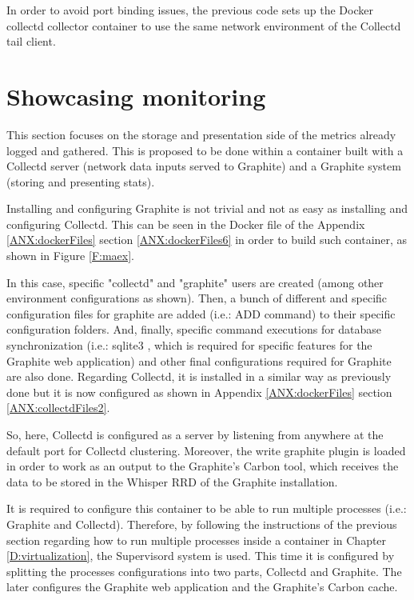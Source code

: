 In order to avoid port binding issues, the previous code sets up the Docker collectd collector container to use the same network environment of the Collectd tail client.

\section{Showcasing monitoring}

This section focuses on the storage and presentation side of the metrics already logged and gathered. This is proposed to be done within a container built with a Collectd server (network data inputs served to Graphite) and a Graphite system (storing and presenting stats).

Installing and configuring Graphite is not trivial and not as easy as installing and configuring Collectd. This can be seen in the Docker file of the Appendix \ref{ANX:dockerFiles} section \ref{ANX:dockerFiles6} in order to build such container, as shown in Figure \ref{F:maex}.

In this case, specific "collectd" and "graphite" users are created (among other environment configurations as shown). Then, a bunch of different and specific configuration files for graphite are added (i.e.: ADD command) to their specific configuration folders. And, finally, specific command executions for database synchronization (i.e.: sqlite3 \cite{sqlite}, which is required for specific features for the Graphite web application) and other final configurations required for Graphite are also done. Regarding Collectd, it is installed in a similar way as previously done but it is now configured as shown in Appendix \ref{ANX:dockerFiles} section \ref{ANX:collectdFiles2}.

So, here, Collectd is configured as a server by listening from anywhere at the default port for Collectd clustering. Moreover, the write graphite plugin is loaded in order to work as an output to the Graphite's Carbon tool, which receives the data to be stored in the Whisper RRD of the Graphite installation.

It is required to configure this container to be able to run multiple processes (i.e.: Graphite and Collectd). Therefore, by following the instructions of the previous section regarding how to run multiple processes inside a container in Chapter \ref{D:virtualization}, the Supervisord system is used. This time it is configured by splitting the processes configurations into two parts, Collectd and Graphite. The later configures the Graphite web application and the Graphite's Carbon cache.

